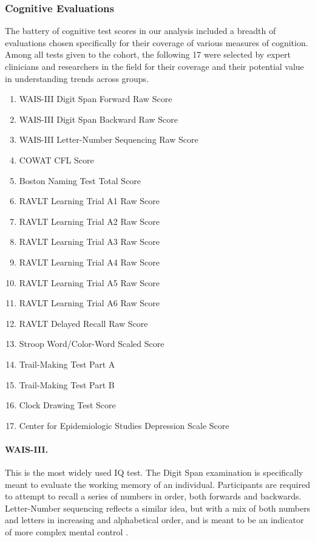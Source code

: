 \subsubsection{Cognitive Evaluations}
The battery of cognitive test scores in our analysis included a breadth of evaluations chosen specifically for their coverage of various measures of cognition. Among all tests given to the cohort, the following 17 were selected by expert clinicians and researchers in the field for their coverage and their potential value in understanding trends across groups.
{\small
\begin{multicols}{2}
\begin{enumerate}
\item WAIS-III Digit Span Forward Raw Score
\item WAIS-III Digit Span Backward Raw Score
\item WAIS-III Letter-Number Sequencing Raw Score
\item COWAT CFL Score
\item Boston Naming Test Total Score
\item RAVLT Learning Trial A1 Raw Score
\item RAVLT Learning Trial A2 Raw Score
\item RAVLT Learning Trial A3 Raw Score
\item RAVLT Learning Trial A4 Raw Score
\item RAVLT Learning Trial A5 Raw Score
\item RAVLT Learning Trial A6 Raw Score
\item RAVLT Delayed Recall Raw Score
\item Stroop Word/Color-Word Scaled Score
\item Trail-Making Test Part A
\item Trail-Making Test Part B
\item Clock Drawing Test Score
\item Center for Epidemiologic Studies Depression Scale Score
\end{enumerate} 
\end{multicols}
}

\paragraph{WAIS-III.} This is the most widely used IQ test. The Digit Span examination is specifically meant to evaluate the working memory of an individual. Participants are required to attempt to recall a series of numbers in order, both forwards and backwards. Letter-Number sequencing reflects a similar idea, but with a mix of both numbers and letters in increasing and alphabetical order, and is meant to be an indicator of more complex mental control \cite{wechsler2014wechsler}.

